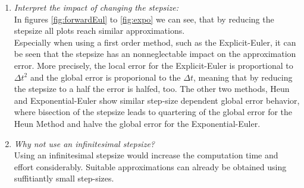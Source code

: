 \documentclass{scrartcl}			%
\begin{document}
\begin{enumerate}
\item \textit{Interpret the impact of changing the stepsize:}\\
In figures \ref{fig:forwardEul} to \ref{fig:expo} we can see, that by reducing the stepsize all plots reach similar approximations.\\
Especially when using a first order method, such as the Explicit-Euler, it can be seen that the stepsize has an nonneglectable impact on the approximation error. More precisely, the local error for the Explicit-Euler is proportional to $\Delta t^2$ and the global error is proporional to the $\Delta t$, meaning that by reducing the stepsize to a half the error is halfed, too. The other two methods, Heun and Exponential-Euler show similar step-size dependent global error behavior, where bisection of the stepsize leads to quartering of the global error for the Heun Method and halve the global error for the Exponential-Euler.
\item \textit{Why not use an infinitesimal stepsize?}\\
Using an infinitesimal stepsize would increase the computation time and effort considerably. Suitable approximations can already be obtained using suffitiantly small step-sizes.
\end{enumerate}
\pagebreak
\end{document}
